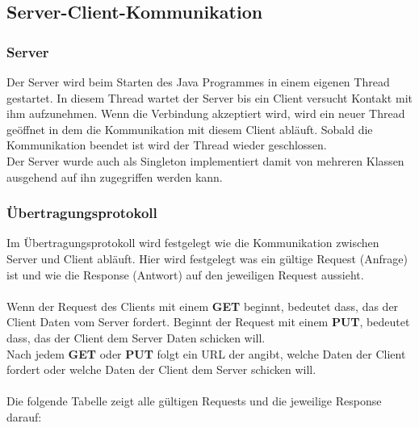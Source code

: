 \newpage

\subsection{Server-Client-Kommunikation}
\subsubsection{Server}
Der Server wird beim Starten des Java Programmes in einem eigenen Thread gestartet. In diesem Thread wartet der Server bis ein Client versucht Kontakt mit ihm aufzunehmen. Wenn die Verbindung akzeptiert wird, wird ein neuer Thread geöffnet in dem die Kommunikation mit diesem Client abläuft. Sobald die Kommunikation beendet ist wird der Thread wieder geschlossen. 
\\ Der Server wurde auch als Singleton implementiert damit von mehreren Klassen ausgehend auf ihn zugegriffen werden kann.

\subsubsection{Übertragungsprotokoll}
Im Übertragungsprotokoll wird festgelegt wie die Kommunikation zwischen Server und Client abläuft. Hier wird festgelegt was ein gültige Request (Anfrage) ist und wie die Response (Antwort) auf den jeweiligen Request aussieht. 
\\ \\
Wenn der Request des Clients mit einem \textbf{GET} beginnt, bedeutet dass, das der Client Daten vom Server fordert. Beginnt der Request mit einem \textbf{PUT}, bedeutet dass, das der Client dem Server Daten schicken will.
\\ Nach jedem \textbf{GET} oder \textbf{PUT} folgt ein URL der angibt, welche Daten der Client fordert oder welche Daten der Client dem Server schicken will.
\\ \\
Die folgende Tabelle zeigt alle gültigen Requests und die jeweilige Response darauf:

